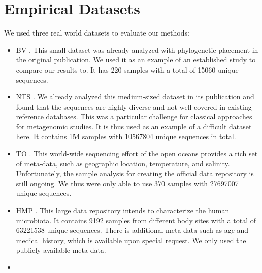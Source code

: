 
\chapter{Empirical Datasets}
\label{ch:EmpiricalDatasets}


We used three %
real world datasets to evaluate our methods:

\begin{itemize}
    \item   \acf{BV} \cite{Srinivasan2012}.
            This small dataset was already analyzed with phylogenetic placement in the original publication.
            We used it as an example of an established study to compare our results to.
            It has \num{220} samples with a total of \num{15 060} unique sequences.
    \item   \acf{NTS} \cite{Mahe2017}.
            We already analyzed this medium-sized dataset in its publication and found that
            the sequences are highly diverse and not well covered in existing reference databases.
            This was a particular challenge for classical approaches for metagenomic studies.
            It is thus used as an example of a difficult dataset here.
            It contains \num{154} samples with \num{10 567 804} unique sequences in total.
    \item   \acf{TO} \cite{Karsenti2011,Sunagawa2015,Guidi2016}.
            This world-wide sequencing effort of the open oceans provides a rich set of meta-data,
            such as geographic location, temperature, and salinity.
            Unfortunately, the sample analysis for creating the official data repository is still ongoing.
            We thus were only able to use \num{370} samples with \num{27 697 007} unique sequences.
    \item   \acf{HMP} \cite{Huttenhower2012,Methe2012}.
            This large data repository intends to characterize the human microbiota.
            It contains \num{9192} samples from different body sites with a total of \num{63 221 538} unique sequences.
            There is additional meta-data such as age and medical history, which is available upon special request.
            We only used the publicly available meta-data.
    \item   {}
\end{itemize}

